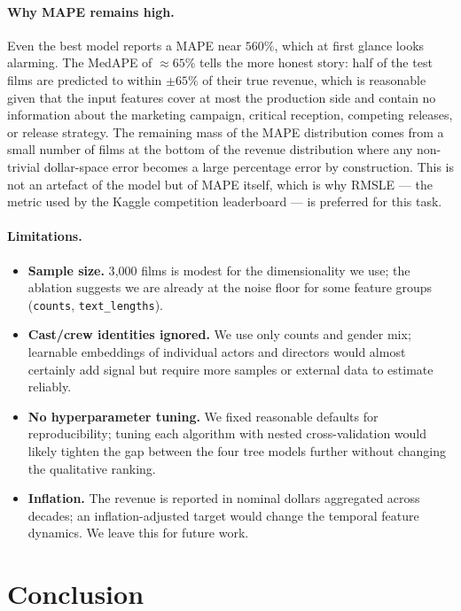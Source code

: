 \documentclass[10pt,a4paper]{article}
\begin{document}
\paragraph{Why MAPE remains high.} Even the best model reports a MAPE near
$560\%$, which at first glance looks alarming. The MedAPE of $\approx 65\%$
tells the more honest story: half of the test films are predicted to within
$\pm 65\%$ of their true revenue, which is reasonable given that the input
features cover at most the production side and contain no information about the
marketing campaign, critical reception, competing releases, or release
strategy. The remaining mass of the MAPE distribution comes from a small number
of films at the bottom of the revenue distribution where any non-trivial
dollar-space error becomes a large percentage error by construction. This is
not an artefact of the model but of MAPE itself, which is why RMSLE — the
metric used by the Kaggle competition leaderboard — is preferred for this task.

\paragraph{Limitations.}
\begin{itemize}
    \item \textbf{Sample size.} 3{,}000 films is modest for the dimensionality
          we use; the ablation suggests we are already at the noise floor for
          some feature groups (\texttt{counts}, \texttt{text\_lengths}).
    \item \textbf{Cast/crew identities ignored.} We use only counts and gender
          mix; learnable embeddings of individual actors and directors would
          almost certainly add signal but require more samples or external
          data to estimate reliably.
    \item \textbf{No hyperparameter tuning.} We fixed reasonable defaults for
          reproducibility; tuning each algorithm with nested cross-validation
          would likely tighten the gap between the four tree models further
          without changing the qualitative ranking.
    \item \textbf{Inflation.} The revenue is reported in nominal dollars
          aggregated across decades; an inflation-adjusted target would change
          the temporal feature dynamics. We leave this for future work.
\end{itemize}

\section{Conclusion}
\end{document}
